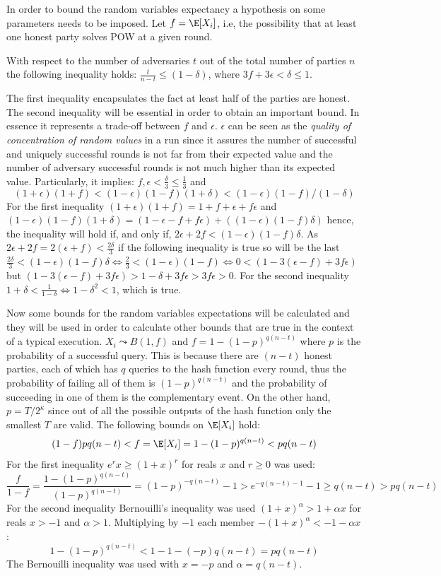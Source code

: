 \documentclass[..]{subfiles}
\begin{document}
In order to bound the random variables expectancy a hypothesis on some parameters needs to be imposed. Let $f = \E[X_i]$, i.e, the possibility that at least one honest party solves POW at a given round.
\begin{definition}
	With respect to the number of adversaries $t$ out of the total number of parties $n$ the following inequality holds: $\frac{t}{n-t} \le (1-\delta)$, where $3f + 3\epsilon < \delta \le 1$.
\end{definition}
The first inequality encapsulates the fact at least half of the parties are honest. The second inequality will be essential in order to obtain an important bound. In essence it represents a trade-off between $f$ and $\epsilon$. $\epsilon$ can be seen as the \textit{quality of concentration of random values} in a run since it assures the number of successful and uniquely successful rounds is not far from their expected value and the number of adversary successful rounds is not much higher than its expected value. Particularly, it implies: $f,\epsilon < \frac{\delta}{3} \le \frac{1}{3}$ and $$(1+\epsilon)(1+f) < (1-\epsilon)(1-f)(1+\delta) < (1-\epsilon)(1-f)/(1-\delta)$$
For the first inequality $(1+\epsilon)(1+f) = 1+f+\epsilon+f\epsilon$ and $(1-\epsilon)(1-f)(1+\delta) = (1-\epsilon-f+f\epsilon)+((1-\epsilon)(1-f)\delta)$ hence, the inequality will hold if, and only if, $2\epsilon + 2f < (1-\epsilon)(1-f)\delta$. As $2\epsilon + 2f = 2(\epsilon + f) < \frac{2\delta}{3}$ if the following inequality is true so will be the last $\frac{2\delta}{3} < (1-\epsilon)(1-f)\delta \iff \frac{2}{3} < (1-\epsilon)(1-f) \iff 0 < (1-3(\epsilon-f) + 3f\epsilon)$ but $(1-3(\epsilon-f) + 3f\epsilon) > 1 - \delta + 3f\epsilon > 3f\epsilon > 0$.
For the second inequality $1+\delta<\frac{1}{1-\delta} \iff 1 - \delta^2 < 1$, which is true.

Now some bounds for the random variables expectations will be calculated and they will be used in order to calculate other bounds that are true in the context of a typical execution. $X_i \leadsto B(1,f)$ and $f=1 - (1-p)^{q(n-t)}$ where $p$ is the probability of a successful query. This is because there are $(n-t)$ honest parties, each of which has $q$ queries to the hash function every round, thus the probability of failing all of them is $(1-p)^{q(n-t)}$ and the probability of succeeding in one of them is the complementary event. On the other hand, $p=T/2^\kappa$ since out of all the possible outputs of the hash function only the smallest $T$ are valid. The following bounds on $\E[X_i]$ hold:
$$(1-f)pq(n-t) < f = \E[X_i] = 1 - (1-p)^{q(n-t)} < pq(n-t)$$
For the first inequality $e^rx \ge (1+x)^r$ for reals $x$ and $r \ge 0$ was used:
$$\frac{f}{1-f} = \frac{1 - (1-p)^{q(n-t)}}{(1-p)^{q(n-t)}} = (1-p)^{-q(n-t)} - 1 > e^{-q(n-t) - 1} - 1 \ge q(n-t) > pq(n-t)$$
For the second inequality Bernouilli's inequality was used $(1+x)^\alpha > 1 + \alpha x$ for reals $x > -1$ and $\alpha > 1$. Multiplying by $-1$ each member $-(1+x)^\alpha < -1 - \alpha x$:
$$1 - (1-p)^{q(n-t)} < 1-1-(-p)q(n-t) = pq(n-t)$$
The Bernouilli inequality was used with $x=-p$ and $\alpha = q(n-t)$.
\end{document}

